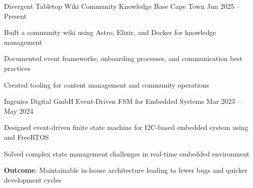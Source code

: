
\begin{cventries}  
  
  \cventry
  {Divergent Tabletop Wiki}
  {Community Knowledge Base}
  {Cape Town}
  {Jun 2025 -- Present}
  {  
    \begin{cvitems}  
      \item Built a community wiki using Astro, Elixir, and Docker for knowledge management
      \item Documented event frameworks, onboarding processes, and communication best practices
      \item Created tooling for content management and community operations
    \end{cvitems}
  }
  
  \cventry
  {Ingenics Digital GmbH}
  {Event-Driven FSM for Embedded Systems}
  {}
  {Mar 2023 -- May 2024}
  {  
    \begin{cvitems}  
      \item Designed event-driven finite state machine for I2C-based embedded system using \cpp{} and FreeRTOS
      \item Solved complex state management challenges in real-time embedded environment
      \item \textbf{Outcome}: Maintainable in-house architecture leading to fewer bugs and quicker development cycles
    \end{cvitems}
  }
  
  
  
\end{cventries}
